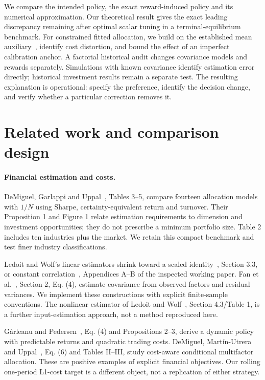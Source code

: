 \documentclass[sigconf,anonymous,review]{acmart}
\begin{document}
We compare the intended policy, the exact reward-induced policy and its numerical approximation. Our theoretical result gives the exact leading discrepancy remaining after optimal scalar tuning in a terminal-equilibrium benchmark. For constrained fitted allocation, we build on the established mean auxiliary~\cite{zhang2021}, identify cost distortion, and bound the effect of an imperfect calibration anchor. A factorial historical audit changes covariance models and rewards separately. Simulations with known covariance identify estimation error directly; historical investment results remain a separate test. The resulting explanation is operational: specify the preference, identify the decision change, and verify whether a particular correction removes it.

\section{Related work and comparison design}
\paragraph{Financial estimation and costs.}
DeMiguel, Garlappi and Uppal~\cite{demiguel2009}, Tables 3--5, compare fourteen allocation models with $1/N$ using Sharpe, certainty-equivalent return and turnover. Their Proposition 1 and Figure 1 relate estimation requirements to dimension and investment opportunities; they do not prescribe a minimum portfolio size. Table 2 includes ten industries plus the market. We retain this compact benchmark and test finer industry classifications.

Ledoit and Wolf's linear estimators shrink toward a scaled identity~\cite{ledoit2004identity}, Section 3.3, or constant correlation~\cite{ledoit2004correlation}, Appendices A--B of the inspected working paper. Fan et al.~\cite{fan2008}, Section 2, Eq. (4), estimate covariance from observed factors and residual variances. We implement these constructions with explicit finite-sample conventions. The nonlinear estimator of Ledoit and Wolf~\cite{ledoit2017}, Section 4.3/Table 1, is a further input-estimation approach, not a method reproduced here.

G\^arleanu and Pedersen~\cite{garleanu2013}, Eq. (4) and Propositions 2--3, derive a dynamic policy with predictable returns and quadratic trading costs. DeMiguel, Mart\'in-Utrera and Uppal~\cite{demiguel2024}, Eq. (6) and Tables II--III, study cost-aware conditional multifactor allocation. These are positive examples of explicit financial objectives. Our rolling one-period L1-cost target is a different object, not a replication of either strategy.
\end{document}
